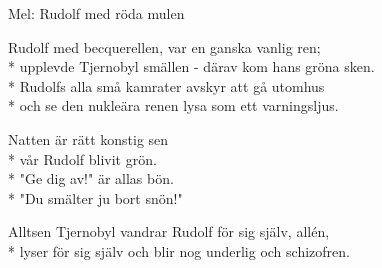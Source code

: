 \begin{SongText}
    \begin{SongVerse}
        Mel: Rudolf med röda mulen
    \end{SongVerse}
    \begin{SongVerse}
        Rudolf med becquerellen, var en ganska vanlig ren;\\*%
        upplevde Tjernobyl smällen - därav kom hans gröna sken.\\*%
        Rudolfs alla små kamrater avskyr att gå utomhus\\*%
        och se den nukleära renen lysa som ett varningsljus.
    \end{SongVerse}
    \begin{SongVerse}
        Natten är rätt konstig sen\\*%
        vår Rudolf blivit grön.\\*%
        "Ge dig av!" är allas bön.\\*%
        "Du smälter ju bort snön!"
    \end{SongVerse}
    \begin{SongVerse}
        Alltsen Tjernobyl vandrar Rudolf för sig själv, allén,\\*%
        lyser för sig själv och blir nog underlig och schizofren.
    \end{SongVerse}
\end{SongText}
